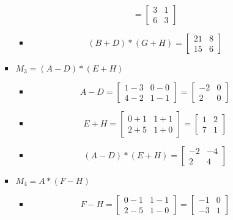 \documentclass{article}
\begin{document}
\begin{itemize}
\begin{itemize}
\begin{itemize}
\begin{itemize}
\[						= 
						\begin{bmatrix}
						3 & 1 \\
						6 & 3
						\end{bmatrix}
						\]
						\item
						\[
						(B + D) * (G + H) = 
						\begin{bmatrix}
						21 & 8 \\
						15 & 6
						\end{bmatrix}
						\]
					\end{itemize}
				\pagebreak
				\item $M_3 = (A - D) * (E + H)$
					\begin{itemize}
						\item 
						\[
						A - D = 
						\begin{bmatrix}
						1 - 3 & 0 - 0 \\
						4 - 2 & 1 - 1
						\end{bmatrix}
						= 
						\begin{bmatrix}
						-2 & 0 \\
						2 & 0
						\end{bmatrix}
						\]
						\item
						\[
						E + H = 
						\begin{bmatrix}
						0 + 1 & 1 + 1 \\
						2 + 5 & 1 + 0
						\end{bmatrix}
						= 
						\begin{bmatrix}
						1 & 2 \\
						7 & 1
						\end{bmatrix}
						\]
						\item
						\[
						(A - D) * (E + H) = 
						\begin{bmatrix}
						-2 & -4 \\
						2 & 4
						\end{bmatrix}
						\]
					\end{itemize}
				\item $M_4 = A * (F - H)$
					\begin{itemize}
						\item 
						\[
						F - H = 
						\begin{bmatrix}
						0 - 1 & 1 - 1 \\
						2 - 5 & 1 - 0
						\end{bmatrix}
						= 
						\begin{bmatrix}
						-1 & 0 \\
						-3 & 1
						\end{bmatrix}
\]
\end{itemize}
\end{itemize}
\end{itemize}
\end{itemize}
\end{document}
